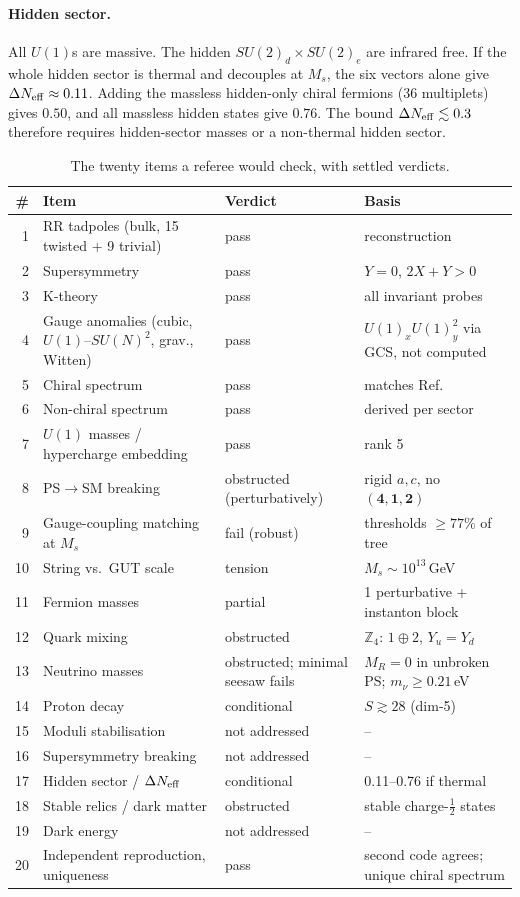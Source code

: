 \documentclass[aps,prd,twocolumn,superscriptaddress,nofootinbib,showkeys]{revtex4-2}
\begin{document}
\paragraph{Hidden sector.} All $U(1)$s are massive. The hidden $SU(2)_d\times SU(2)_e$ are infrared free. If the whole hidden sector is thermal and decouples at $M_s$, the six vectors alone give $\Delta N_{\rm eff}\approx0.11$. Adding the massless hidden-only chiral fermions (36 multiplets) gives $0.50$, and all massless hidden states give $0.76$. The bound $\Delta N_{\rm eff}\lesssim0.3$ therefore requires hidden-sector masses or a non-thermal hidden sector.

\begin{table}[t]\centering\small
\begin{tabular}{@{}rlll@{}}\toprule
\# & Item & Verdict & Basis\\\midrule
1 & RR tadpoles (bulk, 15 twisted + 9 trivial) & pass & reconstruction\\
2 & Supersymmetry & pass & $Y=0$, $2X+Y>0$\\
3 & K-theory & pass & all invariant probes\\
4 & Gauge anomalies (cubic, $U(1)$--$SU(N)^2$, grav., Witten) & pass & $U(1)_xU(1)_y^2$ via GCS, not computed\\
5 & Chiral spectrum & pass & matches Ref.~\cite{HRS}\\
6 & Non-chiral spectrum & pass & derived per sector\\
7 & $U(1)$ masses / hypercharge embedding & pass & rank 5\\
8 & PS$\to$SM breaking & obstructed (perturbatively) & rigid $a,c$, no $(\mathbf4,\mathbf1,\mathbf2)$\\
9 & Gauge-coupling matching at $M_s$ & fail (robust) & thresholds $\ge77\%$ of tree\\
10 & String vs.\ GUT scale & tension & $M_s\sim10^{13}$\,GeV\\
11 & Fermion masses & partial & 1 perturbative + instanton block\\
12 & Quark mixing & obstructed & $\mathbb Z_4$: $1\oplus2$, $Y_u=Y_d$\\
13 & Neutrino masses & obstructed; minimal seesaw fails & $M_R=0$ in unbroken PS; $m_\nu\ge0.21$\,eV\\
14 & Proton decay & conditional & $S\gtrsim28$ (dim-5)\\
15 & Moduli stabilisation & not addressed & --\\
16 & Supersymmetry breaking & not addressed & --\\
17 & Hidden sector / $\Delta N_{\rm eff}$ & conditional & 0.11--0.76 if thermal\\
18 & Stable relics / dark matter & obstructed & stable charge-$\tfrac12$ states\\
19 & Dark energy & not addressed & --\\
20 & Independent reproduction, uniqueness & pass & second code agrees; unique chiral spectrum\\\bottomrule
\end{tabular}
\caption{The twenty items a referee would check, with settled verdicts.}
\end{table}
\end{document}

